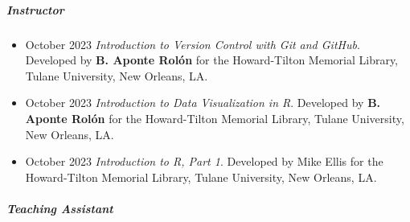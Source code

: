 \documentclass[
  letterpaper,
  DIV=11,
  numbers=noendperiod]{scrartcl}
\let\oldsubparagraph\subparagraph
\renewcommand{\subparagraph}[1]{\oldsubparagraph{#1}\mbox{}}
\begin{document}
\subparagraph{Instructor}\label{instructor}

\begin{itemize}
\item
  October 2023 \textbar{} \emph{Introduction to Version Control with Git
  and GitHub}. Developed by \textbf{B. Aponte Rolón} for the
  Howard-Tilton Memorial Library, Tulane University, New Orleans, LA.
\item
  October 2023 \textbar{} \emph{Introduction to Data Visualization in
  R}. Developed by \textbf{B. Aponte Rolón} for the Howard-Tilton
  Memorial Library, Tulane University, New Orleans, LA.
\item
  October 2023 \textbar{} \emph{Introduction to R, Part 1}. Developed by
  Mike Ellis for the Howard-Tilton Memorial Library, Tulane University,
  New Orleans, LA.
\end{itemize}

\subparagraph{Teaching Assistant}\label{teaching-assistant}
\end{document}
